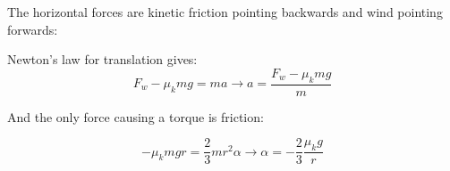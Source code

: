 \documentclass[12pt]{article}
\begin{document}
\begin{enumerate}
{\color{red}
	
	The horizontal forces are kinetic friction pointing backwards and wind pointing forwards:
	
	
	Newton's law for translation gives:
	$$F_w - \mu_k mg = ma \rightarrow a = \frac{F_w - \mu_k mg}{m}$$
	
	And the only force causing a torque is friction:
	
	$$-\mu_k mgr = \frac{2}{3}mr^2 \alpha \rightarrow \alpha = -\frac{2}{3} \frac{\mu_k g}{r}$$
}	

\end{enumerate}
\end{document}
